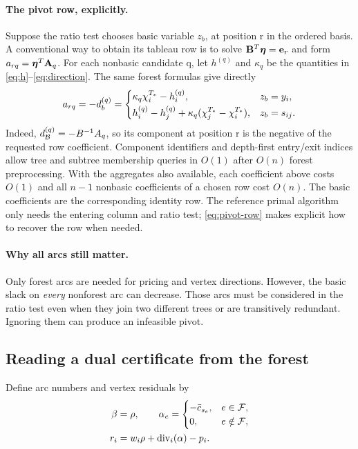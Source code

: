 \paragraph{The pivot row, explicitly.}
Suppose the ratio test chooses basic variable $z_b$, at position r in the
ordered basis. A conventional way to obtain its tableau row is to solve
$\mathbf{B}^T\boldsymbol{\eta}=\mathbf{e}_r$ and form $a_{rq}=\boldsymbol{\eta}^T\mathbf{A}_q$.
For each nonbasic candidate q, let $h^{(q)}$ and $\kappa_q$ be the quantities
in \eqref{eq:h}--\eqref{eq:direction}. The same forest formulas give directly
\begin{equation}\label{eq:pivot-row}
 a_{rq}=-d_b^{(q)}=
 \begin{cases}
 \kappa_q\chi^{T_*}_i-h_i^{(q)},&z_b=y_i,\\[2pt]
 h_i^{(q)}-h_j^{(q)}+
 \kappa_q(\chi^{T_*}_j-\chi^{T_*}_i),&z_b=s_{ij}.
 \end{cases}
\end{equation}
Indeed, $d_{\mathcal B}^{(q)}=-B^{-1}A_q$, so its component at position r
is the negative of the requested row coefficient. Component identifiers and
depth-first entry/exit indices allow tree and subtree membership queries in
$O(1)$ after $O(n)$ forest preprocessing. With the aggregates also available,
each coefficient above costs $O(1)$ and all $n-1$ nonbasic coefficients of a
chosen row cost $O(n)$. The basic coefficients are the corresponding identity
row. The reference primal algorithm only needs the entering column and ratio
test; \eqref{eq:pivot-row} makes explicit how to recover the row when needed.

\paragraph{Why all arcs still matter.}
Only forest arcs are needed for pricing and vertex directions. However, the
basic slack on \emph{every} nonforest arc can decrease. Those arcs must be
considered in the ratio test even when they join two different trees or are
transitively redundant. Ignoring them can produce an infeasible pivot.

\subsection{Reading a dual certificate from the forest}
Define arc numbers and vertex residuals by
\begin{align}
 \beta&=\rho,\qquad
 \alpha_e=\begin{cases}-\bar c_{s_e},&e\in\mathcal F,\\0,&e\notin\mathcal F,
 \end{cases}\label{eq:forest-dual}\\
 r_i&=w_i\rho+\operatorname{div}_i(\alpha)-p_i.\label{eq:dual-residual}
\end{align}

